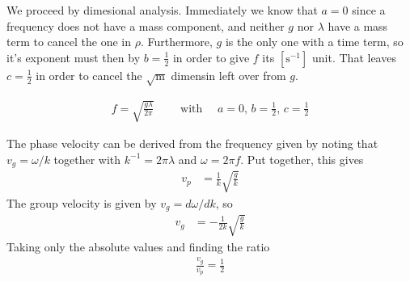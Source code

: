 We proceed by dimesional analysis. Immediately we know that $a = 0$ since a
frequency does not have a mass component, and neither $g$ nor $λ$ have a
mass term to cancel the one in $ρ$. Furthermore, $g$ is the only one with a
time term, so it's exponent must then by $b = \frac 12$ in order to give $f$
its $[\si{\s^{-1}}]$ unit. That leaves $c = \frac 12$ in order to cancel
the $\sqrt{\si{\m}}$ dimensin left over from $g$.

\begin{align*}
    \boxed{
    f = \sqrt{\frac{gλ}{2π}}
	\quad\quad\text{ with }\quad a = 0,\, b = \frac 12,\, c = \frac 12
    }
\end{align*}

The phase velocity can be derived from the frequency given by noting that
$v_g = ω/k$ together with $k^{-1} = 2πλ$ and $ω = 2πf$. Put together, this
gives
\begin{align*}
    v_p &= \frac{1}{k}\sqrt{\frac{g}{k}}
\end{align*}
The group velocity is given by $v_g = dω/dk$, so
\begin{align*}
    v_g &= -\frac{1}{2k}\sqrt{\frac{g}{k}}
\end{align*}
Taking only the absolute values and finding the ratio
\begin{align}
    \boxed{\frac{v_g}{v_p} = \frac 12}
\end{align}
